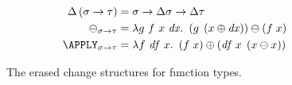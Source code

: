 \begin{figure}
\begin{align*}
\Change{\Fun* \Gs \Gt} &= \Fun{\Gs}{\Fun{\Change\Gs}{\Change\Gt}}\\
\DIFF_{\Fun{\Gs}{\Gt}} & = \Lam{g\ f\ x\ \D x}
  {\Diff{\App*g{\Apply*{\D x}{x}}}{\App*f x}}\\
\APPLY_{\Fun{\Gs}{\Gt}} & = \Lam{f\ \D f\ x}
  {\Apply{\App*{\App{\D f}{x}}{\Diff*xx}}{\App*f x}}
\end{align*}
\caption{The erased change structures for function types.}
\label{fig:diff-apply}
\end{figure}
